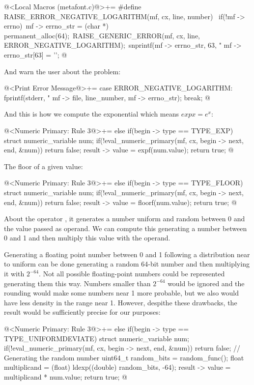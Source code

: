 \iniciocodigo
@<Local Macros (metafont.c)@>+=
#define RAISE_ERROR_NEGATIVE_LOGARITHM(mf, cx, line, number) {\
  if(!mf -> errno){\
    mf -> errno_str = (char *) permanent_alloc(64);\
    RAISE_GENERIC_ERROR(mf, cx, line, ERROR_NEGATIVE_LOGARITHM);\
    snprintf(mf -> errno_str, 63, "%
    mf -> errno_str[63] = '\0';}}
@
\fimcodigo

And warn the user about the problem:

\iniciocodigo
@<Print Error Message@>+=
case ERROR_NEGATIVE_LOGARITHM:
  fprintf(stderr, "%
          mf -> file, line_number, mf -> errno_str);
  break;
@
\fimcodigo

And this is how we compute the exponential which means $exp x = e^x$:

\iniciocodigo
@<Numeric Primary: Rule 3@>+=
else if(begin -> type == TYPE_EXP){
  struct numeric_variable num;
  if(!eval_numeric_primary(mf, cx, begin -> next, end, &num))
    return false;
  result -> value = expf(num.value);
  return true;
}
@
\fimcodigo

The floor of a given value:

\iniciocodigo
@<Numeric Primary: Rule 3@>+=
else if(begin -> type == TYPE_FLOOR){
  struct numeric_variable num;
  if(!eval_numeric_primary(mf, cx, begin -> next, end, &num))
    return false;
  result -> value = floorf(num.value);
  return true;
}
@
\fimcodigo

About the operator , it generates a number
uniform and random between 0 and the value passed as operand. We can
compute this generating a number between 0 and 1 and then multiply
this value with the operand.

Generating a floating point number between 0 and 1 following a
distribution near to uniform can be done generating a random 64-bit
number and then multiplying it with $2^{-64}$. Not all possible
floating-point numbers could be represented generating them this
way. Numbers smaller than $2^{-64}$ would be ignored and the rounding
would make some numbers near 1 more probable, but we also would have
less density in the range near 1. However, despithe these drawbacks,
the result would be sufficiently precise for our purposes:

\iniciocodigo
@<Numeric Primary: Rule 3@>+=
else if(begin -> type == TYPE_UNIFORMDEVIATE){
  struct numeric_variable num;
  if(!eval_numeric_primary(mf, cx, begin -> next, end, &num))
    return false;
  { // Generating the random number
    uint64_t random_bits = random_func();
    float multiplicand = (float) ldexp((double) random_bits, -64);
    result -> value = multiplicand * num.value;
  }
  return true;
}
@
\fimcodigo

